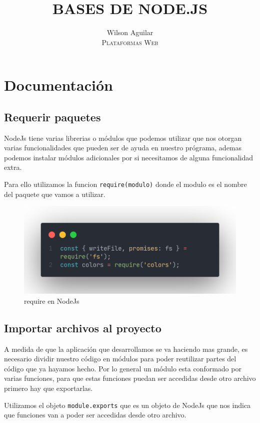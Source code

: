 \documentclass[12pt]{article}
\title{BASES DE NODE.JS}
\author{ 
    Wilson Aguilar \\
    \textsc{Plataformas Web} 
}
\begin{document}
\maketitle

\section{Documentación}

\subsection{Requerir paquetes}

NodeJs tiene varias librerias o módulos que podemos utilizar que nos otorgan varias funcionalidades que pueden ser de ayuda en nuestro prógrama, ademas podemos instalar módulos adicionales por si necesitamos de alguna funcionalidad extra.

Para ello utilizamos la funcion \colorbox{mygray}{\lstinline{require(modulo)}} donde el modulo es el nombre del paquete que vamos a utilizar.

\begin{figure}[H]
    \centering
    \includegraphics[scale=.3]{assets/images/require.png}
    \caption{require en NodeJs}
\end{figure}


\subsection{Importar archivos al proyecto}

A medida de que la aplicación que desarrollamos se va haciendo mas grande, es necesario dividir nuestro código en módulos para poder reutilizar partes del código que ya hayamos hecho. Por lo general un módulo esta conformado por varias funciones, para que estas funciones puedan ser accedidas desde otro archivo primero hay que exportarlas.

Utilizamos el objeto \colorbox{mygray}{\lstinline{module.exports}} que es un objeto de NodeJs que nos indica que funciones van a poder ser accedidas desde otro archivo.
\end{document}
